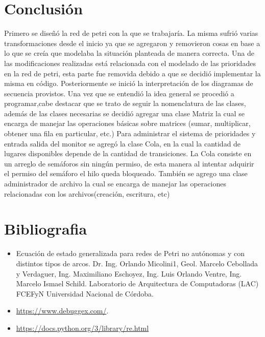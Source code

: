\documentclass{article}
\begin{document}
\section{Conclusión}
	Primero se diseñó la red de petri con la que se trabajaría. La misma sufrió varias transformaciones desde el inicio ya que se agregaron y removieron cosas en base a lo que se creía que modelaba la situación planteada de manera correcta.
Una de las modificaciones realizadas está relacionada con el modelado de las prioridades en la red de petri, esta parte fue removida debido a que se decidió implementar la misma en código.
Posteriormente se inició la interpretación de los diagramas de secuencia provistos.
Una vez que se entendió la idea general se procedió a programar,cabe destacar que  se trato de seguir la nomenclatura de las clases, además de las clases necesarias se decidió agregar una clase Matriz la cual se encarga de manejar las operaciones básicas sobre matrices (sumar, multiplicar, obtener una fila en particular, etc.)
Para administrar el sistema de prioridades y entrada salida del monitor se agregó la clase Cola, en la cual la cantidad de lugares disponibles depende de la cantidad de transiciones.
 La Cola consiste en un arreglo de semáforos sin ningún permiso, de esta manera al intentar adquirir el permiso del semáforo el hilo queda bloqueado.
También se agrego una clase administrador de archivo la cual se encarga de manejar las operaciones relacionadas con los archivos(creación, escritura, etc)
	
\section{Bibliografia}
	\begin{itemize}
		\item Ecuación de estado generalizada para redes de Petri no autónomas y con distintos tipos de arcos. Dr. Ing. Orlando Micolini1, Geol. Marcelo Cebollada y Verdaguer, Ing. Maximiliano Eschoyez, Ing. Luis Orlando Ventre, Ing. Marcelo Ismael Schild. Laboratorio de Arquitectura de Computadoras (LAC) FCEFyN Universidad Nacional de Córdoba.
		\item \url{https://www.debuggex.com/}.
		\item \href {https://docs.python.org/3/library/re.html}{https://docs.python.org/3/library/re.html}
	\end{itemize}
\end{document}
